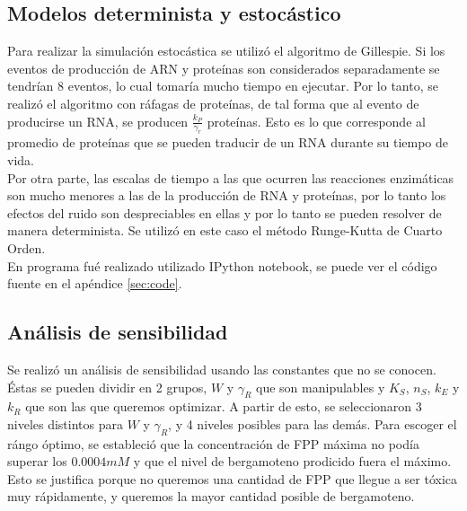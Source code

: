 \documentclass[12pt]{article}
\begin{document}
\subsection{Modelos determinista y estoc\'astico}

Para realizar la simulaci\'on estoc\'astica se utiliz\'o el algoritmo de Gillespie. Si los eventos de producci\'on de ARN y prote\'inas son considerados separadamente se tendr\'ian 8 eventos, lo cual tomar\'ia mucho tiempo en ejecutar. Por lo tanto, se realiz\'o el algoritmo con r\'afagas de prote\'inas, de tal forma que al evento de producirse un RNA, se producen $\frac{k_P}{\gamma_r}$ prote\'inas. Esto es lo que corresponde al promedio de prote\'inas que se pueden traducir de un RNA durante su tiempo de vida.\\

Por otra parte, las escalas de tiempo a las que ocurren las reacciones enzim\'aticas son mucho menores a las de la producci\'on de RNA y prote\'inas, por lo tanto los efectos del ruido son despreciables en ellas y por lo tanto se pueden resolver de manera determinista. Se utiliz\'o en este caso el m\'etodo Runge-Kutta de Cuarto Orden.\\

En programa fu\'e realizado utilizado IPython notebook, se puede ver el c\'odigo fuente en el ap\'endice \ref{sec:code}.

\subsection{An\'alisis de sensibilidad}
Se realiz\'o un an\'alisis de sensibilidad usando las constantes que no se conocen. \'Estas se pueden dividir en 2 grupos, $W$ y $\gamma_R$ que son manipulables y $K_S$, $n_S$, $k_E$ y $k_R$ que son las que queremos optimizar. A partir de esto, se seleccionaron 3 niveles distintos para $W$ y $\gamma_R$, y 4 niveles posibles para las dem\'as. Para escoger el r\'ango \'optimo, se estableci\'o que la concentraci\'on de FPP m\'axima no pod\'ia superar los $0.0004 mM$ y que el nivel de bergamoteno prodicido fuera el m\'aximo. Esto se justifica porque no queremos una cantidad de FPP que llegue a ser t\'oxica muy r\'apidamente, y queremos la mayor cantidad posible de bergamoteno.\\
\end{document}

